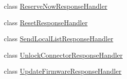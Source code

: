 \begin{DoxyCompactItemize}
\item 
class \hyperlink{classde_1_1rwth_1_1idsg_1_1steve_1_1handler_1_1ocpp15_1_1_reserve_now_response_handler}{Reserve\-Now\-Response\-Handler}
\item 
class \hyperlink{classde_1_1rwth_1_1idsg_1_1steve_1_1handler_1_1ocpp15_1_1_reset_response_handler}{Reset\-Response\-Handler}
\item 
class \hyperlink{classde_1_1rwth_1_1idsg_1_1steve_1_1handler_1_1ocpp15_1_1_send_local_list_response_handler}{Send\-Local\-List\-Response\-Handler}
\item 
class \hyperlink{classde_1_1rwth_1_1idsg_1_1steve_1_1handler_1_1ocpp15_1_1_unlock_connector_response_handler}{Unlock\-Connector\-Response\-Handler}
\item 
class \hyperlink{classde_1_1rwth_1_1idsg_1_1steve_1_1handler_1_1ocpp15_1_1_update_firmware_response_handler}{Update\-Firmware\-Response\-Handler}
\end{DoxyCompactItemize}

